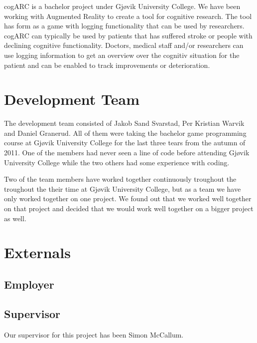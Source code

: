 cogARC is a bachelor project under Gj\o vik University College. We have been
working with \gls{Augmented Reality} to create a tool for cognitive research.
The tool has form as a game with logging functionality that can be used by
researchers. cogARC can typically be used by patients that has suffered stroke
or people with declining cognitive functionality. Doctors, medical staff and/or
researchers can use logging information to get an overview over the cognitiv
situation for the patient and can be enabled to track improvements or
deterioration.

\cite{GenVirtual}

\chapter{Development Team}
The development team consisted of Jakob Sand Svarstad, Per Kristian Warvik and Daniel Granerud.
All of them were taking the bachelor game programming course at Gj\o vik University College for the last three tears from the autumn of 2011. One of the members had never seen a line of code before attending Gj\o vik University College while the two others had some experience with coding.

Two of the team members have worked together continuously troughout the  troughout the their time at Gj\o vik University College, but as a team we have only worked together on one project. We found out that we worked well together on that project and decided that we would work well together on a bigger project as well.

\chapter{Externals}

\section{Employer}

\section{Supervisor}
Our supervisor for this project has been Simon McCallum.



